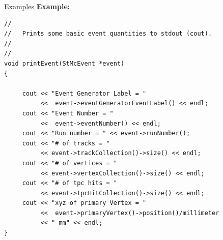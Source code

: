 \begin{Entry}
\item[Examples]
{\bf Example:}
{\footnotesize
\begin{verbatim}
//
//   Prints some basic event quantities to stdout (cout).
//   
//
void printEvent(StMcEvent *event)
{
     
     cout << "Event Generator Label = "
          <<  event->eventGeneratorEventLabel() << endl;
     cout << "Event Number = "
          <<  event->eventNumber() << endl;
     cout << "Run number = " << event->runNumber();
     cout << "# of tracks = "
          << event->trackCollection()->size() << endl;
     cout << "# of vertices = "
          << event->vertexCollection()->size() << endl;
     cout << "# of tpc hits = "
          << event->tpcHitCollection()->size() << endl;
     cout << "xyz of primary Vertex = "
          <<  event->primaryVertex()->position()/millimeter
          << " mm" << endl;
}

\end{verbatim}
}%


\end{Entry}
\clearpage

%
%
